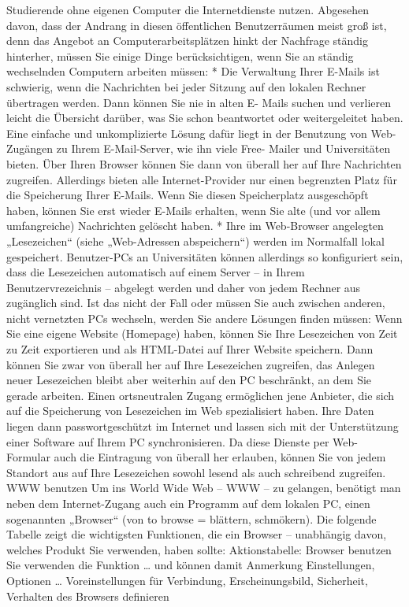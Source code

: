 \documentclass[]{book}
\theoremstyle{definition}
\theoremstyle{definition}
\theoremstyle{definition}
\theoremstyle{remark}
\begin{document}
Studierende ohne eigenen Computer die Internetdienste nutzen. Abgesehen
davon, dass der Andrang in diesen öffentlichen Benutzerräumen meist groß
ist, denn das Angebot an Computerarbeitsplätzen hinkt der Nachfrage
ständig hinterher, müssen Sie einige Dinge berücksichtigen, wenn Sie an
ständig wechselnden Computern arbeiten müssen: * Die Verwaltung Ihrer
E-Mails ist schwierig, wenn die Nachrichten bei jeder Sitzung auf den
lokalen Rechner übertragen werden. Dann können Sie nie in alten E- Mails
suchen und verlieren leicht die Übersicht darüber, was Sie schon
beantwortet oder weitergeleitet haben. Eine einfache und unkomplizierte
Lösung dafür liegt in der Benutzung von Web-Zugängen zu Ihrem
E-Mail-Server, wie ihn viele Free- Mailer und Universitäten bieten. Über
Ihren Browser können Sie dann von überall her auf Ihre Nachrichten
zugreifen. Allerdings bieten alle Internet-Provider nur einen begrenzten
Platz für die Speicherung Ihrer E-Mails. Wenn Sie diesen Speicherplatz
ausgeschöpft haben, können Sie erst wieder E-Mails erhalten, wenn Sie
alte (und vor allem umfangreiche) Nachrichten gelöscht haben. * Ihre im
Web-Browser angelegten „Lesezeichen`` (siehe „Web-Adressen
abspeichern``) werden im Normalfall lokal gespeichert. Benutzer-PCs an
Universitäten können allerdings so konfiguriert sein, dass die
Lesezeichen automatisch auf einem Server -- in Ihrem Benutzervrezeichnis
-- abgelegt werden und daher von jedem Rechner aus zugänglich sind. Ist
das nicht der Fall oder müssen Sie auch zwischen anderen, nicht
vernetzten PCs wechseln, werden Sie andere Lösungen finden müssen: Wenn
Sie eine eigene Website (Homepage) haben, können Sie Ihre Lesezeichen
von Zeit zu Zeit exportieren und als HTML-Datei auf Ihrer Website
speichern. Dann können Sie zwar von überall her auf Ihre Lesezeichen
zugreifen, das Anlegen neuer Lesezeichen bleibt aber weiterhin auf den
PC beschränkt, an dem Sie gerade arbeiten. Einen ortsneutralen Zugang
ermöglichen jene Anbieter, die sich auf die Speicherung von Lesezeichen
im Web spezialisiert haben. Ihre Daten liegen dann passwortgeschützt im
Internet und lassen sich mit der Unterstützung einer Software auf Ihrem
PC synchronisieren. Da diese Dienste per Web- Formular auch die
Eintragung von überall her erlauben, können Sie von jedem Standort aus
auf Ihre Lesezeichen sowohl lesend als auch schreibend zugreifen. WWW
benutzen Um ins World Wide Web -- WWW -- zu gelangen, benötigt man neben
dem Internet-Zugang auch ein Programm auf dem lokalen PC, einen
sogenannten „Browser`` (von to browse = blättern, schmökern). Die
folgende Tabelle zeigt die wichtigsten Funktionen, die ein Browser --
unabhängig davon, welches Produkt Sie verwenden, haben sollte:
Aktionstabelle: Browser benutzen Sie verwenden die Funktion \ldots{} und
können damit Anmerkung Einstellungen, Optionen \ldots{} Voreinstellungen
für Verbindung, Erscheinungsbild, Sicherheit, Verhalten des Browsers
definieren
\end{document}
